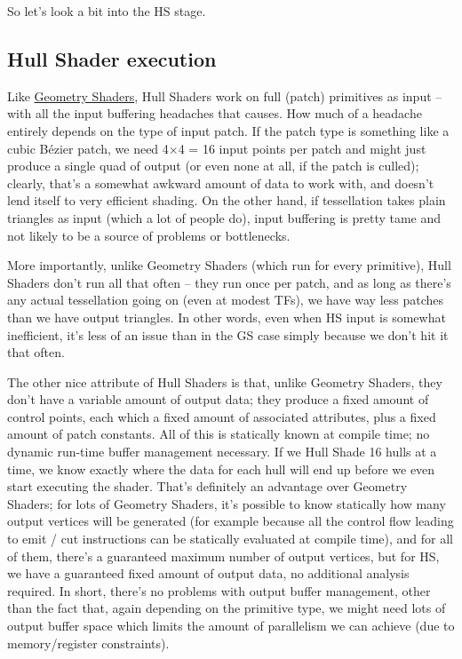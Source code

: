 \documentclass[12pt]{article}
\begin{document}
So let’s look a bit into the HS stage.

\subsection{Hull Shader execution}
\label{sec:org141e46c}

Like \href{https://fgiesen.wordpress.com/2011/07/20/a-trip-through-the-graphics-pipeline-2011-part-10/}{Geometry Shaders}, Hull Shaders work on full (patch) primitives as input – with all the input buffering headaches that causes. How much of a headache entirely depends on the type of input patch. If the patch type is something like a cubic Bézier patch, we need 4×4 = 16 input points per patch and might just produce a single quad of output (or even none at all, if the patch is culled); clearly, that’s a somewhat awkward amount of data to work with, and doesn’t lend itself to very efficient shading. On the other hand, if tessellation takes plain triangles as input (which a lot of people do), input buffering is pretty tame and not likely to be a source of problems or bottlenecks.

More importantly, unlike Geometry Shaders (which run for every primitive), Hull Shaders don’t run all that often – they run once per patch, and as long as there’s any actual tessellation going on (even at modest TFs), we have way less patches than we have output triangles. In other words, even when HS input is somewhat inefficient, it’s less of an issue than in the GS case simply because we don’t hit it that often.

The other nice attribute of Hull Shaders is that, unlike Geometry Shaders, they don’t have a variable amount of output data; they produce a fixed amount of control points, each which a fixed amount of associated attributes, plus a fixed amount of patch constants. All of this is statically known at compile time; no dynamic run-time buffer management necessary. If we Hull Shade 16 hulls at a time, we know exactly where the data for each hull will end up before we even start executing the shader. That’s definitely an advantage over Geometry Shaders; for lots of Geometry Shaders, it’s possible to know statically how many output vertices will be generated (for example because all the control flow leading to emit / cut instructions can be statically evaluated at compile time), and for all of them, there’s a guaranteed maximum number of output vertices, but for HS, we have a guaranteed fixed amount of output data, no additional analysis required. In short, there’s no problems with output buffer management, other than the fact that, again depending on the primitive type, we might need lots of output buffer space which limits the amount of parallelism we can achieve (due to memory/register constraints).
\end{document}
